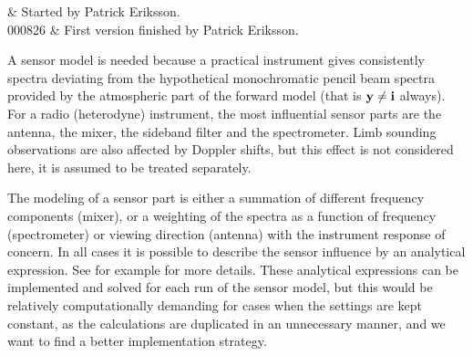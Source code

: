 %
%
 \label{sec:sensor}


%
%
 & Started by Patrick Eriksson.\\
  000826 & First version finished by Patrick Eriksson.\\
\stophistory


%
%
%



%
%
A sensor model is needed because a practical instrument gives consistently
spectra deviating from the hypothetical monochromatic pencil
beam spectra provided by the atmospheric part of the forward model
(that is $\mathbf{y}\neq\mathbf{i}$ always). For a radio (heterodyne) instrument, the
most influential sensor parts are the antenna, the mixer, the sideband
filter and the spectrometer. Limb sounding observations are also
affected by Doppler shifts, but this effect is not considered here, it
is assumed to be treated separately.




 \label{sec:sensor:strategy}

 \label{sec:sensor:strategy:h}
 
 The modeling of a sensor part is either a summation of different
 frequency components (mixer), or a weighting of the spectra as a
 function of frequency (spectrometer) or viewing direction (antenna)
 with the instrument response of concern. In all cases it is
 possible to describe the sensor influence by an analytical
 expression. See for example \citet{eriksson:97a} for more details.
 These analytical expressions can be implemented and solved for each
 run of the sensor model, but this would be relatively computationally
 demanding for cases when the settings are kept constant, as the
 calculations are duplicated in an unnecessary manner, and we want to
 find a better implementation strategy.
 
